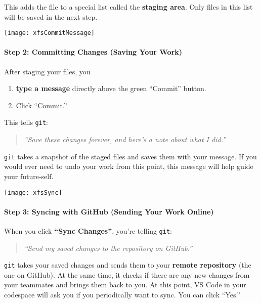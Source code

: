 \documentclass{ximera}
\begin{document}
    This adds the file to a special list called the \textbf{staging area}. Only
    files in this list will be saved in the next step.

\pdfOnly{\end{multicols*}}

\newpage

\begin{image}
    \texttt{[image: xfsCommitMessage]}
\end{image}
    \paragraph{Step 2: Committing Changes (Saving Your Work)}

    After staging your files, you
    \begin{enumerate}
        \item \textbf{type a message} directly above the green ``Commit''
              button.
        \item Click ``Commit.''
    \end{enumerate}
    This tells \verb!git!:
    \begin{quote}
        \emph{``Save these changes forever, and here's a note about what I
            did.''}
    \end{quote}
    \verb!git! takes a snapshot of the staged files and saves them with your message.
    If you would ever need to undo your work from this point, this message will
    help guide your future-self.
\pdfOnly{\end{multicols*}}

\newpage

\begin{image}
    \texttt{[image: xfsSync]}
\end{image}
\paragraph{Step 3: Syncing with GitHub (Sending Your Work Online)}
When you click \textbf{``Sync Changes''}, you're telling \verb!git!:
\begin{quote}
    \emph{``Send my saved changes to the repository on GitHub.''}
\end{quote}
\verb!git! takes your saved changes and sends them to your \textbf{remote
    repository}
(the one on GitHub). At the same time, it checks if there are any new
changes from your teammates and brings them back to you. At this point,
VS Code in your codespace will ask you if you periodically want to sync.
You can click ``Yes.''
\pdfOnly{\end{multicols*}}
\end{document}
